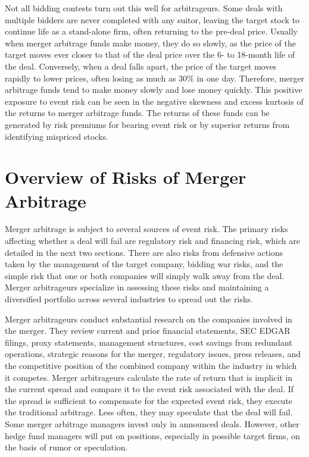 \documentclass[11pt]{article}
\begin{document}
Not all bidding contests turn out this well for arbitrageurs. Some deals with multiple bidders are never completed with any suitor, leaving the target stock to continue life as a stand-alone firm, often returning to the pre-deal price. Usually when merger arbitrage funds make money, they do so slowly, as the price of the target moves ever closer to that of the deal price over the 6- to 18-month life of the deal. Conversely, when a deal falls apart, the price of the target moves rapidly to lower prices, often losing as much as $30 \%$ in one day. Therefore, merger arbitrage funds tend to make money slowly and lose money quickly. This positive exposure to event risk can be seen in the negative skewness and excess kurtosis of the returns to merger arbitrage funds. The returns of these funds can be generated by risk premiums for bearing event risk or by superior returns from identifying mispriced stocks.

\section*{Overview of Risks of Merger Arbitrage}
Merger arbitrage is subject to several sources of event risk. The primary risks affecting whether a deal will fail are regulatory risk and financing risk, which are detailed in the next two sections. There are also risks from defensive actions taken by the management of the target company, bidding war risks, and the simple risk that one or both companies will simply walk away from the deal. Merger arbitrageurs specialize in assessing these risks and maintaining a diversified portfolio across several industries to spread out the risks.

Merger arbitrageurs conduct substantial research on the companies involved in the merger. They review current and prior financial statements, SEC EDGAR filings, proxy statements, management structures, cost savings from redundant operations, strategic reasons for the merger, regulatory issues, press releases, and the competitive position of the combined company within the industry in which it competes. Merger arbitrageurs calculate the rate of return that is implicit in the current spread and compare it to the event risk associated with the deal. If the spread is sufficient to compensate for the expected event risk, they execute the traditional arbitrage. Less often, they may speculate that the deal will fail. Some merger arbitrage managers invest only in announced deals. However, other hedge fund managers will put on positions, especially in possible target firms, on the basis of rumor or speculation.
\end{document}
